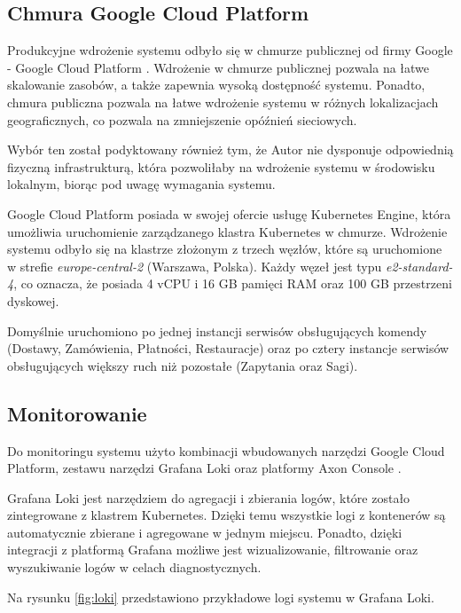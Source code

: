 \subsection{Chmura Google Cloud Platform}

Produkcyjne wdrożenie systemu odbyło się w chmurze publicznej od firmy Google - Google Cloud Platform \cite{gcp}. Wdrożenie w chmurze publicznej pozwala na łatwe skalowanie zasobów, a także zapewnia wysoką dostępność systemu. Ponadto, chmura publiczna pozwala na łatwe wdrożenie systemu w różnych lokalizacjach geograficznych, co pozwala na zmniejszenie opóźnień sieciowych. 

Wybór ten został podyktowany również tym, że Autor nie dysponuje odpowiednią fizyczną infrastrukturą, która pozwoliłaby na wdrożenie systemu w środowisku lokalnym, biorąc pod uwagę wymagania systemu.

Google Cloud Platform posiada w swojej ofercie usługę Kubernetes Engine, która umożliwia uruchomienie zarządzanego klastra Kubernetes w chmurze. Wdrożenie systemu odbyło się na klastrze złożonym z trzech węzłów, które są uruchomione w strefie \textit{europe-central-2} (Warszawa, Polska). Każdy węzeł jest typu \textit{e2-standard-4}, co oznacza, że posiada 4 vCPU i 16 GB pamięci RAM oraz 100 GB przestrzeni dyskowej.

Domyślnie uruchomiono po jednej instancji serwisów obsługujących komendy (Dostawy, Zamówienia, Płatności, Restauracje) oraz po cztery instancje serwisów obsługujących większy ruch niż pozostałe (Zapytania oraz Sagi).

\subsection{Monitorowanie}

Do monitoringu systemu użyto kombinacji wbudowanych narzędzi Google Cloud Platform, zestawu narzędzi Grafana Loki \cite{grafana-loki} oraz platformy Axon Console \cite{axon-console}.

Grafana Loki jest narzędziem do agregacji i zbierania logów, które zostało zintegrowane z klastrem Kubernetes. Dzięki temu wszystkie logi z kontenerów są automatycznie zbierane i agregowane w jednym miejscu. Ponadto, dzięki integracji z platformą Grafana możliwe jest wizualizowanie, filtrowanie oraz wyszukiwanie logów w celach diagnostycznych.

Na rysunku \ref{fig:loki} przedstawiono przykładowe logi systemu w Grafana Loki.

\clearpage

